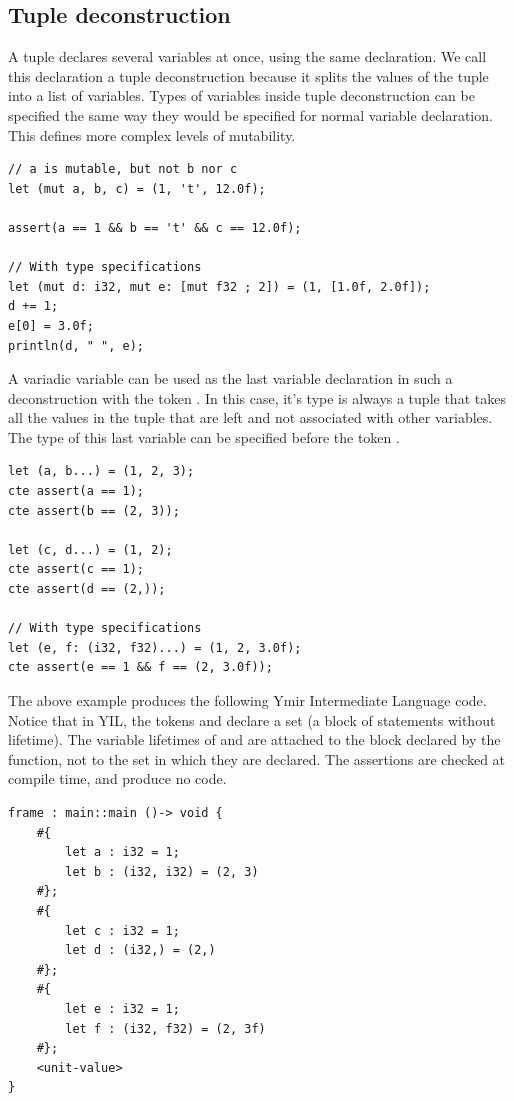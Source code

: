 \subsection{Tuple deconstruction}

A tuple declares several variables at once, using the same
 declaration. We call this declaration a tuple deconstruction
because it splits the values of the tuple into a list of variables. Types of
variables inside tuple deconstruction can be specified the same way they would
be specified for normal variable declaration. This defines more
complex levels of mutability.

\begin{lstlisting}[style=coloredverbatim]
  // a is mutable, but not b nor c
let (mut a, b, c) = (1, 't', 12.0f);

assert(a == 1 && b == 't' && c == 12.0f);

// With type specifications
let (mut d: i32, mut e: [mut f32 ; 2]) = (1, [1.0f, 2.0f]);
d += 1;
e[0] = 3.0f;
println(d, " ", e);
\end{lstlisting}

A variadic variable can be used as the last variable declaration in such a
deconstruction with the token . In this case, it's type is always a
tuple that takes all the values in the tuple that are left and not associated
with other variables. The type of this last variable can be specified before the
token .

\begin{lstlisting}[style=coloredverbatim]
let (a, b...) = (1, 2, 3);
cte assert(a == 1);
cte assert(b == (2, 3));

let (c, d...) = (1, 2);
cte assert(c == 1);
cte assert(d == (2,));

// With type specifications
let (e, f: (i32, f32)...) = (1, 2, 3.0f);
cte assert(e == 1 && f == (2, 3.0f));
\end{lstlisting}

The above example produces the following Ymir Intermediate Language code. Notice
that in YIL, the tokens \tokennolst{\#\{} and \tokennolst{\#\}} declare a
set (a block of statements without lifetime). The variable lifetimes of 
and  are attached to the block declared by the function, not to the
set in which they are declared. The assertions are checked at compile time, and
produce no code.

\begin{lstlisting}[style=myilVerb]
frame : main::main ()-> void {
    #{
        let a : i32 = 1;
        let b : (i32, i32) = (2, 3)
    #};
    #{
        let c : i32 = 1;
        let d : (i32,) = (2,)
    #};
    #{
        let e : i32 = 1;
        let f : (i32, f32) = (2, 3f)
    #};
    <unit-value>
}
\end{lstlisting}

